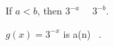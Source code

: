 \documentclass{ximera}
\begin{document}
\begin{example}
\begin{question}



If $a < b$, then $3^{-a}$ \, \wordChoice{\choice{<} \choice[correct]{>}} \, $3^{-b}$.  \\



\end{question}





\begin{question}



$g(x) = 3^{-x}$  is a(n) \,  .  \\



\end{question}








\end{example}
\end{document}
